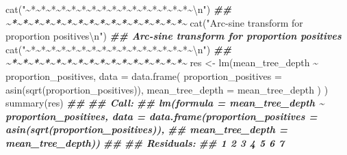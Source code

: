 \documentclass[
  11pt,
  oneside]{book}
\newenvironment{Shaded}{\begin{snugshade}}{\end{snugshade}}
\newcommand{\AttributeTok}[1]{\textcolor[rgb]{0.77,0.63,0.00}{#1}}
\newcommand{\DocumentationTok}[1]{\textcolor[rgb]{0.56,0.35,0.01}{\textbf{\textit{#1}}}}
\newcommand{\FunctionTok}[1]{\textcolor[rgb]{0.00,0.00,0.00}{#1}}
\newcommand{\NormalTok}[1]{#1}
\newcommand{\OtherTok}[1]{\textcolor[rgb]{0.56,0.35,0.01}{#1}}
\newcommand{\SpecialCharTok}[1]{\textcolor[rgb]{0.00,0.00,0.00}{#1}}
\newcommand{\StringTok}[1]{\textcolor[rgb]{0.31,0.60,0.02}{#1}}
\begin{document}
\begin{Shaded}
\begin{Highlighting}[]
\FunctionTok{cat}\NormalTok{(}\StringTok{"\textasciitilde{}*\textasciitilde{}*\textasciitilde{}*\textasciitilde{}*\textasciitilde{}*\textasciitilde{}*\textasciitilde{}*\textasciitilde{}*\textasciitilde{}*\textasciitilde{}*\textasciitilde{}*\textasciitilde{}*\textasciitilde{}*\textasciitilde{}*\textasciitilde{}*\textasciitilde{}*\textasciitilde{}}\SpecialCharTok{\textbackslash{}n}\StringTok{"}\NormalTok{)}
\DocumentationTok{\#\# \textasciitilde{}*\textasciitilde{}*\textasciitilde{}*\textasciitilde{}*\textasciitilde{}*\textasciitilde{}*\textasciitilde{}*\textasciitilde{}*\textasciitilde{}*\textasciitilde{}*\textasciitilde{}*\textasciitilde{}*\textasciitilde{}*\textasciitilde{}*\textasciitilde{}*\textasciitilde{}*\textasciitilde{}}
\FunctionTok{cat}\NormalTok{(}\StringTok{"Arc{-}sine transform for proportion positives}\SpecialCharTok{\textbackslash{}n}\StringTok{"}\NormalTok{)}
\DocumentationTok{\#\# Arc{-}sine transform for proportion positives}
\FunctionTok{cat}\NormalTok{(}\StringTok{"\textasciitilde{}*\textasciitilde{}*\textasciitilde{}*\textasciitilde{}*\textasciitilde{}*\textasciitilde{}*\textasciitilde{}*\textasciitilde{}*\textasciitilde{}*\textasciitilde{}*\textasciitilde{}*\textasciitilde{}*\textasciitilde{}*\textasciitilde{}*\textasciitilde{}*\textasciitilde{}*\textasciitilde{}}\SpecialCharTok{\textbackslash{}n}\StringTok{"}\NormalTok{)}
\DocumentationTok{\#\# \textasciitilde{}*\textasciitilde{}*\textasciitilde{}*\textasciitilde{}*\textasciitilde{}*\textasciitilde{}*\textasciitilde{}*\textasciitilde{}*\textasciitilde{}*\textasciitilde{}*\textasciitilde{}*\textasciitilde{}*\textasciitilde{}*\textasciitilde{}*\textasciitilde{}*\textasciitilde{}*\textasciitilde{}}
\NormalTok{res }\OtherTok{\textless{}{-}} \FunctionTok{lm}\NormalTok{(mean\_tree\_depth }\SpecialCharTok{\textasciitilde{}}\NormalTok{ proportion\_positives,}
  \AttributeTok{data =} \FunctionTok{data.frame}\NormalTok{(}
    \AttributeTok{proportion\_positives =} \FunctionTok{asin}\NormalTok{(}\FunctionTok{sqrt}\NormalTok{(proportion\_positives)),}
    \AttributeTok{mean\_tree\_depth =}\NormalTok{ mean\_tree\_depth}
\NormalTok{  )}
\NormalTok{)}
\FunctionTok{summary}\NormalTok{(res)}
\DocumentationTok{\#\# }
\DocumentationTok{\#\# Call:}
\DocumentationTok{\#\# lm(formula = mean\_tree\_depth \textasciitilde{} proportion\_positives, data = data.frame(proportion\_positives = asin(sqrt(proportion\_positives)), }
\DocumentationTok{\#\#     mean\_tree\_depth = mean\_tree\_depth))}
\DocumentationTok{\#\# }
\DocumentationTok{\#\# Residuals:}
\DocumentationTok{\#\#        1        2        3        4        5        6        7 }

\end{Highlighting}
\end{Shaded}
\end{document}
